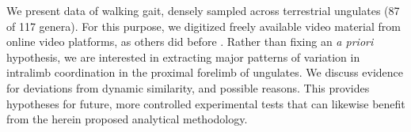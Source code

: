 \documentclass[10pt, a4paper]{article}
\begin{document}
\begin{linenumbers}[1]
We present data of walking gait, densely sampled across terrestrial ungulates (87 of 117 genera). 
For this purpose, we digitized freely available video material from online video platforms, as others did before \citep{Biancardi2012,Lees2016}. 
Rather than fixing an \textit{a priori} hypothesis, we are interested in extracting major patterns of variation in intralimb coordination in the proximal forelimb of ungulates. 
We discuss evidence for deviations from dynamic similarity, and possible reasons. 
This provides hypotheses for future, more controlled experimental tests that can likewise benefit from the herein proposed analytical methodology. 

\end{linenumbers}







\FloatBarrier\pagebreak
\end{document}
